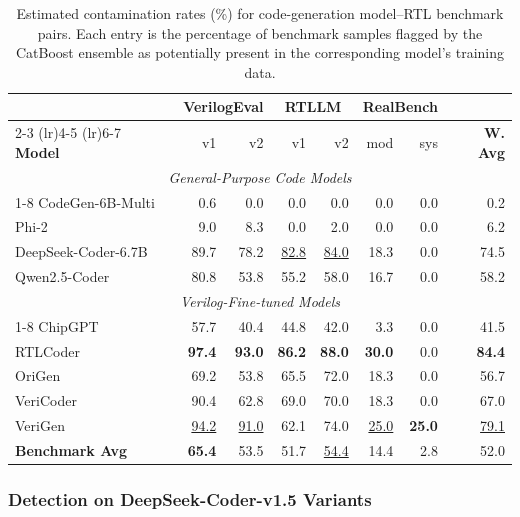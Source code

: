 \begin{table}[!t]
\centering
\caption{Estimated contamination rates (\%) for code-generation model--RTL benchmark pairs. Each entry is the percentage of benchmark samples flagged by the CatBoost ensemble as potentially present in the corresponding model's training data.}
\label{tab:benchmark_detection}
\small
\begin{tabular*}{\textwidth}{@{\extracolsep{\fill}}l*{6}{r}r}
\toprule
& \multicolumn{2}{c}{\textbf{VerilogEval}} & \multicolumn{2}{c}{\textbf{RTLLM}} & \multicolumn{2}{c}{\textbf{RealBench}} & \\
\cmidrule(lr){2-3} \cmidrule(lr){4-5} \cmidrule(lr){6-7}
\textbf{Model} & v1 & v2 & v1 & v2 & mod & sys & \textbf{W. Avg} \\
\midrule
\multicolumn{8}{c}{\textit{General-Purpose Code Models}} \\
\cmidrule{1-8}
CodeGen-6B-Multi    & 0.6  & 0.0  & 0.0  & 0.0  & 0.0  & 0.0  & 0.2 \\
Phi-2               & 9.0  & 8.3  & 0.0  & 2.0  & 0.0  & 0.0  & 6.2 \\
DeepSeek-Coder-6.7B & 89.7 & 78.2 & \uline{82.8} & \uline{84.0} & 18.3 & 0.0  & 74.5 \\
Qwen2.5-Coder       & 80.8 & 53.8 & 55.2 & 58.0 & 16.7 & 0.0  & 58.2 \\
\midrule
\multicolumn{8}{c}{\textit{Verilog-Fine-tuned Models}} \\
\cmidrule{1-8}
ChipGPT             & 57.7 & 40.4 & 44.8 & 42.0 & 3.3  & 0.0  & 41.5 \\
RTLCoder            & \textbf{97.4} & \textbf{93.0} & \textbf{86.2} & \textbf{88.0} & \textbf{30.0} & 0.0  & \textbf{84.4} \\
OriGen              & 69.2 & 53.8 & 65.5 & 72.0 & 18.3 & 0.0  & 56.7 \\
VeriCoder           & 90.4 & 62.8 & 69.0 & 70.0 & 18.3 & 0.0  & 67.0 \\
VeriGen             & \uline{94.2} & \uline{91.0} & 62.1 & 74.0 & \uline{25.0} & \textbf{25.0} & \uline{79.1} \\
\midrule
\textbf{Benchmark Avg} & \textbf{65.4} & 53.5 & 51.7 & \uline{54.4} & 14.4 & 2.8 & 52.0 \\
\bottomrule
\end{tabular*}
\end{table}

\subsubsection{Detection on DeepSeek-Coder-v1.5 Variants}

